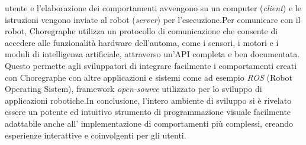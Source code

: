 \begin{sloppypar}
{utente e l’elaborazione dei comportamenti avvengono su un computer (\textit{client}) e le
istruzioni vengono inviate al robot (\textit{server}) per l’esecuzione.\newline Per comunicare con
il robot, Choregraphe utilizza un protocollo di comunicazione che consente di accedere alle funzionalità
hardware dell'automa, come i sensori, i motori e i moduli di intelligenza artificiale,
attraverso un’API completa e ben documentata. Questo permette agli sviluppatori
di integrare facilmente i comportamenti creati con Choregraphe con altre
applicazioni e sistemi come ad esempio \textit{ROS} (Robot Operating Sistem), framework \textit{open-source} utilizzato per lo sviluppo di applicazioni robotiche.\newline In conclusione, l’intero ambiente di sviluppo si è rivelato essere un potente ed intuitivo
strumento di programmazione visuale facilmente adattabile anche all’ implementazione
di comportamenti più complessi, creando esperienze interattive e coinvolgenti per gli utenti.
}
\newpage


\end{sloppypar}

